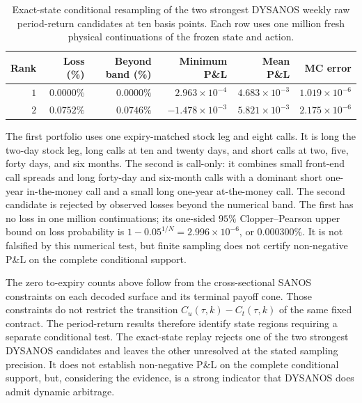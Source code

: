 \begin{table}[H]
\centering
\small
\setlength{\tabcolsep}{5pt}
\begin{tabular}{rrrrrr}
\toprule
Rank & Loss (\%) & Beyond band (\%) & Minimum P\&L
     & Mean P\&L & MC error\\
\midrule
$1$ & $0.0000\%$ & $0.0000\%$ & $ 2.963\times10^{-4}$
    & $4.683\times10^{-3}$ & $1.019\times10^{-6}$\\
$2$ & $0.0752\%$ & $0.0746\%$ & $-1.478\times10^{-3}$
    & $5.821\times10^{-3}$ & $2.175\times10^{-6}$\\
\bottomrule
\end{tabular}
\caption{Exact-state conditional resampling of the two strongest DYSANOS
weekly raw period-return candidates at ten basis points. Each row uses one
million fresh physical continuations of the frozen state and action.}
\label{tab:period_exact_state_replay}
\end{table}

The first portfolio uses one expiry-matched stock leg and eight calls. It is
long the two-day stock leg, long calls at ten and twenty days, and short calls
at two, five, forty days, and six months. The second is call-only: it combines
small front-end call spreads and long forty-day and six-month calls with a
dominant short one-year in-the-money call and a small long one-year
at-the-money call. The
second candidate is rejected by observed losses beyond the numerical band.
The first has no loss in one million continuations; its one-sided $95\%$
Clopper--Pearson upper bound on loss probability is
$1-0.05^{1/N}=2.996\times10^{-6}$, or $0.000300\%$. It is not falsified by
this numerical test, but finite sampling does not certify non-negative P\&L
on the complete conditional support.

The zero to-expiry counts above follow from the cross-sectional SANOS
constraints on each decoded surface and its terminal payoff cone. Those
constraints do not restrict the transition
$C_u(\tau,k)-C_t(\tau,k)$ of the same fixed contract. The period-return results
therefore identify state regions requiring a separate conditional test. The
exact-state replay rejects one of the two strongest DYSANOS candidates and
leaves the other unresolved at the stated sampling precision. It does not
establish non-negative P\&L on the complete conditional support, but, considering
the evidence, is a strong indicator that DYSANOS does admit dynamic arbitrage.


\endinput
